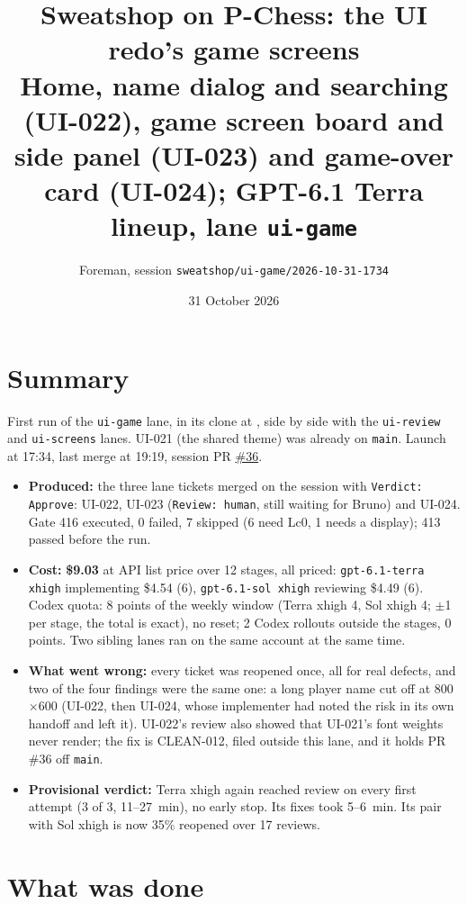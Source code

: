 \documentclass[11pt,a4paper]{article}
\title{Sweatshop on P-Chess: the UI redo's game screens\\\large Home, name dialog and searching (UI-022), game screen board and side panel (UI-023) and game-over card (UI-024); GPT-6.1 Terra lineup, lane \texttt{ui-game}}
\author{Foreman, session \texttt{sweatshop/ui-game/2026-10-31-1734}}
\date{31 October 2026}
\begin{document}
\maketitle

\section*{Summary}

First run of the \texttt{ui-game} lane, in its clone at ,
side by side with the \texttt{ui-review} and \texttt{ui-screens} lanes. UI-021 (the shared theme)
was already on \texttt{main}. Launch at 17:34, last merge at 19:19, session PR
\href{https://github.com/Laginho/P-Chess/pull/36}{\#36}.

\begin{itemize}
  \item \textbf{Produced:} the three lane tickets merged on the session with
        \texttt{Verdict: Approve}: UI-022, UI-023 (\texttt{Review: human}, still waiting for
        Bruno) and UI-024. Gate 416 executed, 0 failed, 7 skipped (6 need Lc0, 1 needs a display);
        413 passed before the run.
  \item \textbf{Cost:} \textbf{\$9.03} at API list price over 12 stages, all priced:
        \texttt{gpt-6.1-terra xhigh} implementing \$4.54 (6), \texttt{gpt-6.1-sol xhigh} reviewing
        \$4.49 (6). Codex quota: 8 points of the weekly window (Terra xhigh 4, Sol xhigh 4;
        $\pm$1 per stage, the total is exact), no reset; 2 Codex rollouts outside the stages,
        0 points. Two sibling lanes ran on the same account at the same time.
  \item \textbf{What went wrong:} every ticket was reopened once, all for real defects, and two of
        the four findings were the same one: a long player name cut off at 800$\times$600
        (UI-022, then UI-024, whose implementer had noted the risk in its own handoff and left
        it). UI-022's review also showed that UI-021's font weights never render; the fix is
        CLEAN-012, filed outside this lane, and it holds PR \#36 off \texttt{main}.
  \item \textbf{Provisional verdict:} Terra xhigh again reached review on every first attempt
        (3 of 3, 11--27~min), no early stop. Its fixes took 5--6~min. Its pair with Sol xhigh is
        now 35\% reopened over 17 reviews.
\end{itemize}

\section*{What was done}
\end{document}

